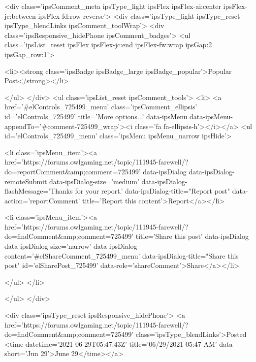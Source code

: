 	<div class='ipsComment_meta ipsType_light ipsFlex ipsFlex-ai:center ipsFlex-jc:between ipsFlex-fd:row-reverse'>
		<div class='ipsType_light ipsType_reset ipsType_blendLinks ipsComment_toolWrap'>
			<div class='ipsResponsive_hidePhone ipsComment_badges'>
				<ul class='ipsList_reset ipsFlex ipsFlex-jc:end ipsFlex-fw:wrap ipsGap:2 ipsGap_row:1'>
					
					
					
					
					
						<li><strong class='ipsBadge ipsBadge_large ipsBadge_popular'>Popular Post</strong></li>
					
				</ul>
			</div>
			<ul class='ipsList_reset ipsComment_tools'>
				<li>
					<a href='#elControls_725499_menu' class='ipsComment_ellipsis' id='elControls_725499' title='More options...' data-ipsMenu data-ipsMenu-appendTo='#comment-725499_wrap'><i class='fa fa-ellipsis-h'></i></a>
					<ul id='elControls_725499_menu' class='ipsMenu ipsMenu_narrow ipsHide'>
						
							<li class='ipsMenu_item'><a href='https://forums.owlgaming.net/topic/111945-farewell/?do=reportComment&amp;comment=725499' data-ipsDialog data-ipsDialog-remoteSubmit data-ipsDialog-size='medium' data-ipsDialog-flashMessage='Thanks for your report.' data-ipsDialog-title="Report post" data-action='reportComment' title='Report this content'>Report</a></li>
						
						
							<li class='ipsMenu_item'><a href='https://forums.owlgaming.net/topic/111945-farewell/?do=findComment&amp;comment=725499' title='Share this post' data-ipsDialog data-ipsDialog-size='narrow' data-ipsDialog-content='#elShareComment_725499_menu' data-ipsDialog-title="Share this post" id='elSharePost_725499' data-role='shareComment'>Share</a></li>
						
                        
						
						
						
							
								
							
							
							
							
							
							
						
					</ul>
				</li>
				
			</ul>
		</div>

		<div class='ipsType_reset ipsResponsive_hidePhone'>
			<a href='https://forums.owlgaming.net/topic/111945-farewell/?do=findComment&amp;comment=725499' class='ipsType_blendLinks'>Posted <time datetime='2021-06-29T05:47:43Z' title='06/29/2021 05:47  AM' data-short='Jun 29'>June 29</time></a> 
			
